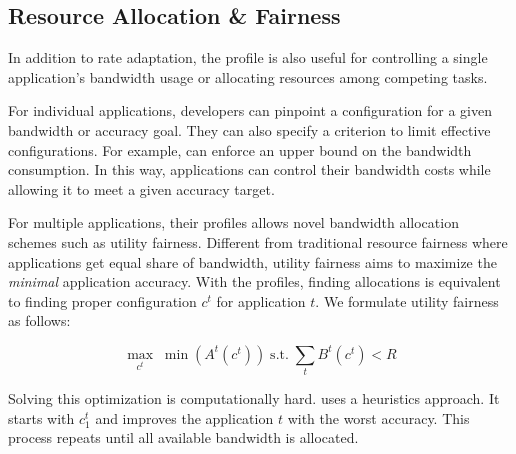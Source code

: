 \subsection{Resource Allocation \& Fairness}

In addition to rate adaptation, the profile is also useful for controlling a
single application's bandwidth usage or allocating resources among competing
tasks.

For individual applications, developers can pinpoint a configuration for a given
bandwidth or accuracy goal. They can also specify a criterion to limit effective
configurations. For example, \sysname{} can enforce an upper bound on the
bandwidth consumption. In this way, applications can control their bandwidth
costs while allowing it to meet a given accuracy target.

For multiple applications, their profiles allows novel bandwidth allocation
schemes such as utility fairness. Different from traditional resource fairness
where applications get equal share of bandwidth, utility fairness aims
to maximize the \textit{minimal} application accuracy. With the profiles,
finding allocations is equivalent to finding proper configuration $c^t$ for
application $t$. We formulate utility fairness as follows:


\begin{equation}
 \label{eq:multitask}
 \underset{c^t}{\max} \; \min({A^t(c^t)})
 \;
 \text{s.t.}
 \;
 \sum_t{B^t(c^t)} < R
\end{equation}


Solving this optimization is computationally hard. \sysname{} uses a heuristics
approach. It starts with $c^t_1$ and improves the application $t$ with the worst
accuracy. This process repeats until all available bandwidth is allocated.

